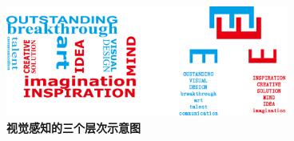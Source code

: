\begin{figure}[htbp]
	\centering
	\includegraphics[width=0.83\textwidth]{chapters/ch2_figs/phi}	%
	\caption{\textbf{视觉感知的三个层次示意图}}
	\label{fig:2_1}      
\end{figure}